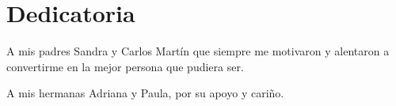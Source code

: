 \section*{Dedicatoria}
A mis padres Sandra y Carlos Martín que siempre me motivaron y alentaron a convertirme en la mejor persona que pudiera ser. 

A mis hermanas Adriana y Paula, por su apoyo y cariño.

\newpage